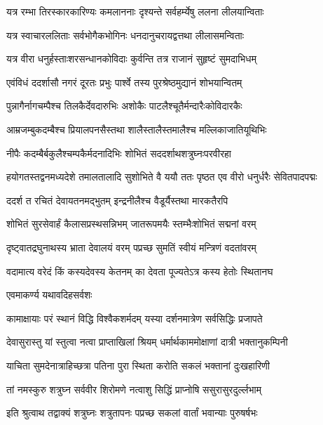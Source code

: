 \twolineshloka
{यत्र रम्भा तिरस्कारकारिण्यः कमलाननाः}
{दृश्यन्ते सर्वहर्म्येषु ललना लीलयान्विताः}%

\twolineshloka
{यत्र स्वाचारललिताः सर्वभोगैकभोगिनः}
{धनदानुचरायद्वत्तथा लीलासमन्विताः}%

\twolineshloka
{यत्र वीरा धनुर्हस्ताःशरसन्धानकोविदाः}
{कुर्वन्ति तत्र राजानं सुहृष्टं सुमदाभिधम्}%

\twolineshloka
{एवंविधं ददर्शासौ नगरं दूरतः प्रभुः}
{पार्श्वे तस्य पुरश्रेष्ठमुद्यानं शोभयान्वितम्}%

\twolineshloka
{पुन्नागैर्नागचम्पैश्च तिलकैर्देवदारुभिः}
{अशोकैः पाटलैश्चूतैर्मन्दारैःकोविदारकैः}%

\twolineshloka
{आम्रजम्बुकदम्बैश्च प्रियालपनसैस्तथा}
{शालैस्तालैस्तमालैश्च मल्लिकाजातियूथिभिः}%

\twolineshloka
{नीपैः कदम्बैर्बकुलैश्चम्पकैर्मदनादिभिः}
{शोभितं सददर्शाथशत्रुघ्नःपरवीरहा}%

\fourlineindentedshloka
{हयोगतस्तद्वनमध्यदेशे}
{तमालतालादि सुशोभिते वै}
{ययौ ततः पृष्ठत एव वीरो}
{धनुर्धरैः सेवितपादपद्मः}%

\twolineshloka
{ददर्श त रचितं देवायतनमद्भुतम्}
{इन्द्रनीलैश्च वैडूर्यैस्तथा मारकतैरपि}%

\twolineshloka
{शोभितं सुरसेवार्हं कैलासप्रस्थसन्निभम्}
{जातरूपमयैः स्तम्भैःशोभितं सद्मनां वरम्}%

\twolineshloka
{दृष्ट्वातद्रघुनाथस्य भ्राता देवालयं वरम्}
{पप्रच्छ सुमतिं स्वीयं मन्त्रिणं वदतांवरम्}%


\twolineshloka
{वदामात्य वरेदं किं कस्यदेवस्य केतनम्}
{का देवता पूज्यतेऽत्र कस्य हेतोः स्थितानघ}%

\onelineshloka
{एवमाकर्ण्य यथावदिहसर्वशः}%

\twolineshloka
{कामाक्षायाः परं स्थानं विद्धि विश्वैकशर्मदम्}
{यस्या दर्शनमात्रेण सर्वसिद्धिः प्रजापते}%

\twolineshloka
{देवासुरास्तु यां स्तुत्वा नत्वा प्राप्ताखिलां श्रियम्}
{धर्मार्थकाममोक्षाणां दात्री भक्तानुकम्पिनी}%

\twolineshloka
{याचिता सुमदेनात्राहिच्छत्रा पतिना पुरा}
{स्थिता करोति सकलं भक्तानां दुःखहारिणी}%

\twolineshloka
{तां नमस्कुरु शत्रुघ्न सर्ववीर शिरोमणे}
{नत्वाशु सिद्धिं प्राप्नोषि ससुरासुरदुर्ल्लभाम्}%

\twolineshloka
{इति श्रुत्वाथ तद्वाक्यं शत्रुघ्नः शत्रुतापनः}
{पप्रच्छ सकलां वार्तां भवान्याः पुरुषर्षभः}%


